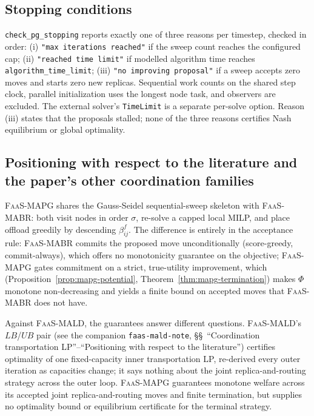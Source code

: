 \subsection{Stopping conditions}
\label{sec:mapg-stopping}

\texttt{check\_pg\_stopping} reports exactly one of three reasons per
timestep, checked in order: (i) \texttt{"max iterations reached"} if the
sweep count reaches the configured cap; (ii) \texttt{"reached time limit"} if
modelled algorithm time reaches \texttt{algorithm\_time\_limit}; (iii)
\texttt{"no improving proposal"} if a sweep accepts zero moves and starts
zero new replicas. Sequential work counts on the shared step clock, parallel
initialization uses the longest node task, and observers are excluded.
The external solver's \texttt{TimeLimit} is a separate per-solve option.
Reason (iii) states that the proposals stalled; none of the three reasons
certifies Nash equilibrium or global optimality.

\subsection{Positioning with respect to the literature and the paper's other coordination families}
\label{sec:mapg-related}

\textsc{FaaS-MAPG} shares the Gauss-Seidel sequential-sweep skeleton with
\textsc{FaaS-MABR}: both visit nodes in order $\sigma$, re-solve a capped
local MILP, and place offload greedily by descending $\beta_{ij}^f$. The
difference is entirely in the acceptance rule: \textsc{FaaS-MABR} commits the
proposed move unconditionally (score-greedy, commit-always), which offers no
monotonicity guarantee on the objective; \textsc{FaaS-MAPG} gates commitment
on a strict, true-utility improvement, which (Proposition~\ref{prop:mapg-potential},
Theorem~\ref{thm:mapg-termination}) makes $\Phi$ monotone non-decreasing and
yields a finite bound on accepted moves that \textsc{FaaS-MABR}
does not have.

Against \textsc{FaaS-MALD}, the guarantees answer different questions.
\textsc{FaaS-MALD}'s $LB$/$UB$ pair (see the companion \texttt{faas-mald-note},
\S\S~``Coordination transportation LP''--``Positioning with respect to the
literature'') certifies optimality of one fixed-capacity inner
transportation LP, re-derived every outer iteration as capacities change; it
says nothing about the joint replica-and-routing strategy across the outer
loop. \textsc{FaaS-MAPG} guarantees monotone welfare across its accepted
joint replica-and-routing moves and finite termination, but supplies no
optimality bound or equilibrium certificate for the terminal strategy.


